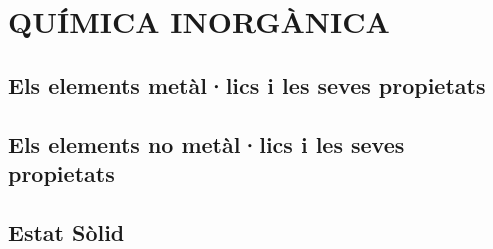 \chapter{QUÍMICA INORGÀNICA}

\section{Els elements metàl·lics i les seves propietats}
\section{Els elements no metàl·lics i les seves propietats}
\section{Estat Sòlid}
